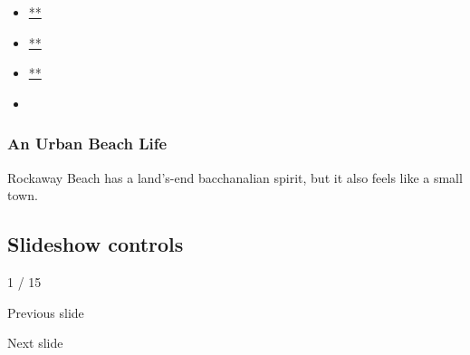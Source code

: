 \begin{itemize}
\item
  \href{https://www.facebookcorewwwi.onion/sharer.php?app_id=9869919170\&u=https\%3A\%2F\%2Fwww.nytimes3xbfgragh.onion\%2Fslideshow\%2F2020\%2F07\%2F31\%2Frealestate\%2Fan-urban-beach-life.html\%3Fsmid\%3Dfb-share\&name=An\%20Urban\%20Beach\%20Life\&redirect_uri=https\%3A\%2F\%2Fwww.facebookcorewwwi.onion\%2F}{**}
\item
  \href{https://twitter.com/intent/tweet?url=https\%3A\%2F\%2Fwww.nytimes3xbfgragh.onion\%2Fslideshow\%2F2020\%2F07\%2F31\%2Frealestate\%2Fan-urban-beach-life.html\%3Fsmid\%3Dtw-share\&text=An\%20Urban\%20Beach\%20Life}{**}
\item
  \href{mailto:?subject=nytimes3xbfgragh.onion\%3A\%20An\%20Urban\%20Beach\%20Life\&body=From\%20The\%20New\%20York\%20Times\%3A\%0A\%0AAn\%20Urban\%20Beach\%20Life\%0A\%0ARockaway\%20Beach\%20has\%20a\%20land\%E2\%80\%99s-end\%20bacchanalian\%20spirit\%2C\%20but\%20it\%20also\%20feels\%20like\%20a\%20small\%20town.\%0A\%0Ahttps\%3A\%2F\%2Fwww.nytimes3xbfgragh.onion\%2Fslideshow\%2F2020\%2F07\%2F31\%2Frealestate\%2Fan-urban-beach-life.html\%3Fsmid\%3Dem-share}{**}
\item
\end{itemize}

\hypertarget{an-urban-beach-life-1}{%
\subsubsection{An Urban Beach Life}\label{an-urban-beach-life-1}}

Rockaway Beach has a land's-end bacchanalian spirit, but it also feels
like a small town.

\hypertarget{slideshow-controls}{%
\subsection{Slideshow controls}\label{slideshow-controls}}

1 / 15

Previous slide

Next slide
